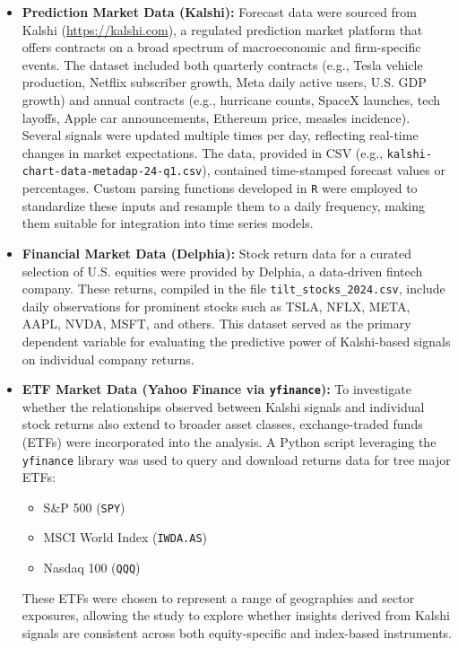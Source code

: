 \documentclass[12pt]{report}
\begin{document}
\begin{itemize}
    \item \textbf{Prediction Market Data (Kalshi):} Forecast data were sourced from Kalshi (\url{https://kalshi.com}), a regulated prediction market platform that offers contracts on a broad spectrum of macroeconomic and firm-specific events. The dataset included both quarterly contracts (e.g., Tesla vehicle production, Netflix subscriber growth, Meta daily active users, U.S. GDP growth) and annual contracts (e.g., hurricane counts, SpaceX launches, tech layoffs, Apple car announcements, Ethereum price, measles incidence). Several signals were updated multiple times per day, reflecting real-time changes in market expectations. The data, provided in CSV (e.g., \texttt{kalshi-chart-data-metadap-24-q1.csv}), contained time-stamped forecast values or percentages. Custom parsing functions developed in \texttt{R} were employed to standardize these inputs and resample them to a daily frequency, making them suitable for integration into time series models.

    \item \textbf{Financial Market Data (Delphia):} Stock return data for a curated selection of U.S. equities were provided by Delphia, a data-driven fintech company. These returns, compiled in the file \texttt{tilt\_stocks\_2024.csv}, include daily observations for prominent stocks such as TSLA, NFLX, META, AAPL, NVDA, MSFT, and others. This dataset served as the primary dependent variable for evaluating the predictive power of Kalshi-based signals on individual company returns.

    \item \textbf{ETF Market Data (Yahoo Finance via \texttt{yfinance}):} To investigate whether the relationships observed between Kalshi signals and individual stock returns also extend to broader asset classes, exchange-traded funds (ETFs) were incorporated into the analysis. A Python script leveraging the \texttt{yfinance} library was used to query and download returns data for tree major ETFs:
    \begin{itemize}
        \item S\&P 500 (\texttt{SPY})
        \item MSCI World Index (\texttt{IWDA.AS})
        \item Nasdaq 100 (\texttt{QQQ})
    \end{itemize}
    These ETFs were chosen to represent a range of geographies and sector exposures, allowing the study to explore whether insights derived from Kalshi signals are consistent across both equity-specific and index-based instruments.
\end{itemize}
\end{document}
